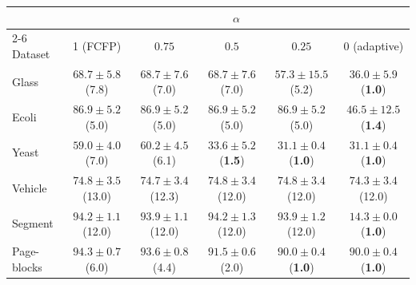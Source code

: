 \begin{minipage}{\linewidth}
\centering
{}
\label{tab:adaptive}
\footnotesize
\setlength{\tabcolsep}{3pt}
\begin{tabular}{@{}lccccc@{}}
\toprule
 & \multicolumn{5}{c}{$\alpha$} \\ \cmidrule(lr){2-6}
Dataset & 1 (FCFP) & $0.75$ & $0.5$ & $0.25$ & 0 (adaptive) \\
\midrule
Glass & $68.7 \pm 5.8$ (7.8) & $68.7 \pm 7.6$ (7.0) & $68.7 \pm 7.6$ (7.0) & $57.3 \pm 15.5$ (5.2) & $\mathbf{36.0} \pm 5.9$ (\textbf{1.0}) \\
Ecoli & $86.9 \pm 5.2$ (5.0) & $86.9 \pm 5.2$ (5.0) & $86.9 \pm 5.2$ (5.0) & $86.9 \pm 5.2$ (5.0) & $\mathbf{46.5} \pm 12.5$ (\textbf{1.4}) \\
Yeast & $59.0 \pm 4.0$ (7.0) & $60.2 \pm 4.5$ (6.1) & $\mathbf{33.6} \pm 5.2$ (\textbf{1.5}) & $\mathbf{31.1} \pm 0.4$ (\textbf{1.0}) & $\mathbf{31.1} \pm 0.4$ (\textbf{1.0}) \\
Vehicle & $74.8 \pm 3.5$ (13.0) & $74.7 \pm 3.4$ (12.3) & $74.8 \pm 3.4$ (12.0) & $74.8 \pm 3.4$ (12.0) & $74.3 \pm 3.4$ (12.0) \\
Segment & $94.2 \pm 1.1$ (12.0) & $93.9 \pm 1.1$ (12.0) & $94.2 \pm 1.3$ (12.0) & $93.9 \pm 1.2$ (12.0) & $\mathbf{14.3} \pm 0.0$ (\textbf{1.0}) \\
Page-blocks & $94.3 \pm 0.7$ (6.0) & $93.6 \pm 0.8$ (4.4) & $91.5 \pm 0.6$ (2.0) & $\mathbf{90.0} \pm 0.4$ (\textbf{1.0}) & $\mathbf{90.0} \pm 0.4$ (\textbf{1.0}) \\
\bottomrule
\end{tabular}
\end{minipage}\par
